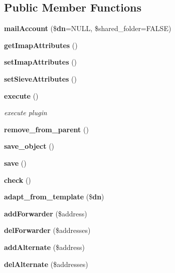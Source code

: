 \subsection*{Public Member Functions}
\begin{CompactItemize}
\item 
{\bf mail\-Account} (\${\bf dn}=NULL, \$shared\_\-folder=FALSE)\label{classmailAccount_a0}

\item 
{\bf get\-Imap\-Attributes} ()\label{classmailAccount_a1}

\item 
{\bf set\-Imap\-Attributes} ()\label{classmailAccount_a2}

\item 
{\bf set\-Sieve\-Attributes} ()\label{classmailAccount_a3}

\item 
{\bf execute} ()
\begin{CompactList}\small\item\em execute plugin \item\end{CompactList}\item 
{\bf remove\_\-from\_\-parent} ()\label{classmailAccount_a5}

\item 
{\bf save\_\-object} ()\label{classmailAccount_a6}

\item 
{\bf save} ()\label{classmailAccount_a7}

\item 
{\bf check} ()\label{classmailAccount_a8}

\item 
{\bf adapt\_\-from\_\-template} (\${\bf dn})\label{classmailAccount_a9}

\item 
{\bf add\-Forwarder} (\$address)\label{classmailAccount_a10}

\item 
{\bf del\-Forwarder} (\$addresses)\label{classmailAccount_a11}

\item 
{\bf add\-Alternate} (\$address)\label{classmailAccount_a12}

\item 
{\bf del\-Alternate} (\$addresses)\label{classmailAccount_a13}

\end{CompactItemize}
